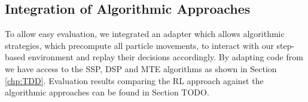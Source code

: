 \subsection{Integration of Algorithmic Approaches} \label{sec:AlgorithmIntegration}
To allow easy evaluation, we integrated an adapter which allows algorithmic strategies, which precompute all particle movements, to interact with our step-based environment and replay their decisions accordingly. By adapting code from \cite{becker2020} we have access to the SSP, DSP and MTE algorithms as shown in Section \ref{chp:TDD}. Evaluation results comparing the RL approach against the algorithmic approaches can be found in Section TODO.

